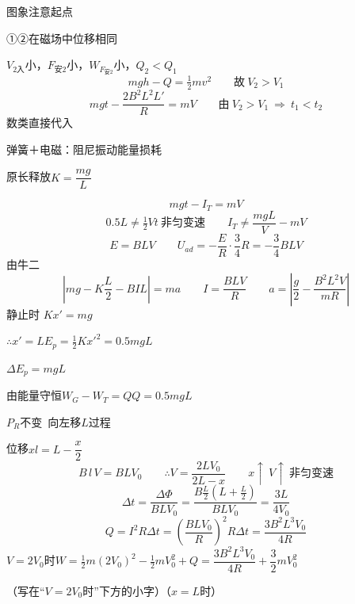 图象注意起点

①②在磁场中位移相同

$V_{2\text{入}}$小，$F_{\text{安}2}$小，$W_{F_{\text{安}2}}$小，$Q_2<Q_1$
\[ mgh-Q=\tfrac12mv^2\qquad \text{故}\ V_2>V_1 \]
\[ mgt-\frac{2B^2L^2L'}{R}=mV\qquad \text{由}\ V_2>V_1\ \Rightarrow\ t_1<t_2 \]
数类直接代入

弹簧＋电磁：阻尼振动\quad 能量损耗
\begin{problem}
原长释放\quad $K=\dfrac{mg}{L}$
\begin{solution}
\[ mgt-I_T=mV \]
\[ 0.5L\neq\tfrac12Vt\ \text{非匀变速}\qquad I_T\neq\frac{mgL}{V}-mV \]
\[ E=BLV\qquad U_{ad}=-\frac{E}{R}\cdot\frac34R=-\frac34BLV \]
由牛二
\[ \left|mg-K\frac{L}{2}-BIL\right|=ma\qquad I=\frac{BLV}{R}\qquad a=\left|\frac{g}{2}-\frac{B^2L^2V}{mR}\right| \]
静止时 $Kx'=mg$

$\therefore x'=L$\qquad $E_p=\tfrac12Kx'^2=0.5mgL$

$\Delta E_p=mgL$

由能量守恒\quad $W_G-W_T=Q$\qquad $Q=0.5mgL$
\end{solution}
\end{problem}
\begin{problem}
$P_R$不变\ 向左移$L$过程
\begin{solution}
位移$x$\quad $l=L-\dfrac{x}{2}$
\[ B\,l\,V=BLV_0\qquad \therefore V=\frac{2LV_0}{2L-x}\qquad x\uparrow\ V\uparrow\ \text{非匀变速} \] %
\[ \Delta t=\frac{\Delta\Phi}{BLV_0}=\frac{B\frac{L}{2}\left(L+\frac{L}{2}\right)}{BLV_0}=\frac{3L}{4V_0} \]
\[ Q=I^2R\Delta t=\left(\frac{BLV_0}{R}\right)^2R\Delta t=\frac{3B^2L^3V_0}{4R} \]
$V=2V_0$时\quad $W=\tfrac12m(2V_0)^2-\tfrac12mV_0^2+Q=\dfrac{3B^2L^3V_0}{4R}+\dfrac32mV_0^2$

（写在“$V=2V_0$时”下方的小字）（$x=L$时）
\end{solution}
\end{problem}
